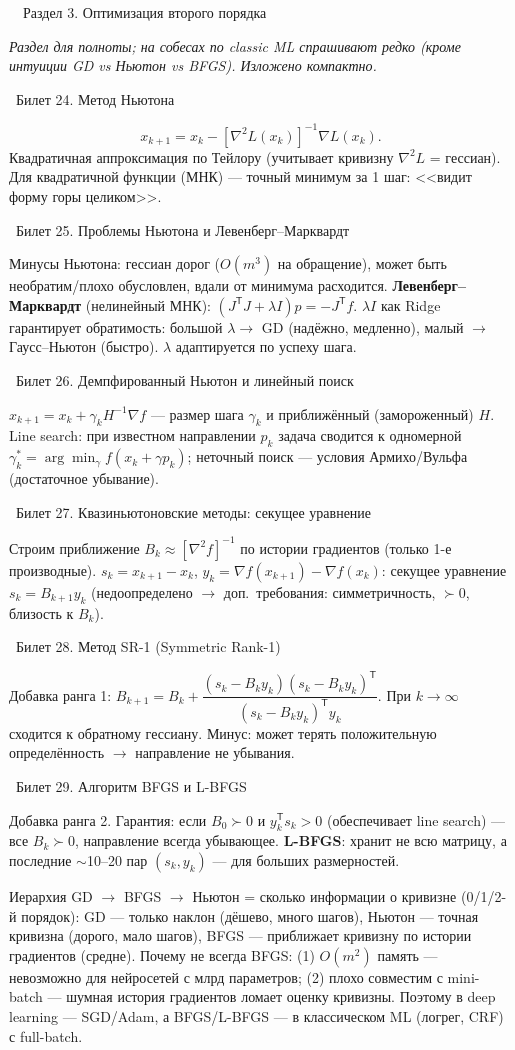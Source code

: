 \documentclass[12pt, a4paper]{article}
\newcommand{\razdel}[2]{%
  \clearpage%
  \noindent\colorbox{razdelcol}{\parbox{\dimexpr\linewidth-2\fboxsep\relax}{%
    \color{white}\LARGE\bfseries\strut\ \ Раздел #1. #2%
  }}%
  \vspace{10pt}%
}
\newcommand{\bilet}[2]{%
  \vspace{10pt}%
  \noindent\colorbox{qcolor}{\parbox{\dimexpr\linewidth-2\fboxsep\relax}{%
    \color{white}\large\bfseries\strut\ Билет #1. #2%
  }}%
  \nopagebreak\vspace{5pt}\par\nopagebreak%
}
\newcommand{\tr}{^{\mathsf{T}}}
\begin{document}
\razdel{3}{Оптимизация второго порядка}

\emph{Раздел для полноты; на собесах по classic ML спрашивают редко (кроме интуиции GD vs Ньютон vs BFGS). Изложено компактно.}

\bilet{24}{Метод Ньютона}
\[
  x_{k+1} = x_k - [\nabla^2 L(x_k)]^{-1}\nabla L(x_k).
\]
Квадратичная аппроксимация по Тейлору (учитывает кривизну $\nabla^2 L$ = гессиан). Для квадратичной функции (МНК) --- точный минимум за 1 шаг: <<видит форму горы целиком>>.

\bilet{25}{Проблемы Ньютона и Левенберг--Марквардт}
Минусы Ньютона: гессиан дорог ($O(m^3)$ на обращение), может быть необратим/плохо обусловлен, вдали от минимума расходится. \textbf{Левенберг--Марквардт} (нелинейный МНК): $(J\tr J + \lambda I)p = -J\tr f$. $\lambda I$ как Ridge гарантирует обратимость: большой $\lambda \to$ GD (надёжно, медленно), малый $\to$ Гаусс--Ньютон (быстро). $\lambda$ адаптируется по успеху шага.

\bilet{26}{Демпфированный Ньютон и линейный поиск}
$x_{k+1} = x_k + \gamma_k H^{-1}\nabla f$ --- размер шага $\gamma_k$ и приближённый (замороженный) $H$. Line search: при известном направлении $p_k$ задача сводится к одномерной $\gamma_k^* = \arg\min_\gamma f(x_k + \gamma p_k)$; неточный поиск --- условия Армихо/Вульфа (достаточное убывание).

\bilet{27}{Квазиньютоновские методы: секущее уравнение}
Строим приближение $B_k \approx [\nabla^2 f]^{-1}$ по истории градиентов (только 1-е производные). $s_k = x_{k+1} - x_k$, $y_k = \nabla f(x_{k+1}) - \nabla f(x_k)$: секущее уравнение $s_k = B_{k+1}y_k$ (недоопределено $\to$ доп.\ требования: симметричность, $\succ 0$, близость к $B_k$).

\bilet{28}{Метод SR-1 (Symmetric Rank-1)}
Добавка ранга 1: $B_{k+1} = B_k + \dfrac{(s_k - B_k y_k)(s_k - B_k y_k)\tr}{(s_k - B_k y_k)\tr y_k}$. При $k \to \infty$ сходится к обратному гессиану. Минус: может терять положительную определённость $\to$ направление не убывания.

\bilet{29}{Алгоритм BFGS и L-BFGS}
Добавка ранга 2. Гарантия: если $B_0 \succ 0$ и $y_k\tr s_k > 0$ (обеспечивает line search) --- все $B_k \succ 0$, направление всегда убывающее. \textbf{L-BFGS}: хранит не всю матрицу, а последние $\sim$10--20 пар $(s_k, y_k)$ --- для больших размерностей.

\begin{fishkabox}
Иерархия GD $\to$ BFGS $\to$ Ньютон = сколько информации о кривизне (0/1/2-й порядок): GD --- только наклон (дёшево, много шагов), Ньютон --- точная кривизна (дорого, мало шагов), BFGS --- приближает кривизну по истории градиентов (средне). Почему не всегда BFGS: (1) $O(m^2)$ память --- невозможно для нейросетей с млрд параметров; (2) плохо совместим с mini-batch --- шумная история градиентов ломает оценку кривизны. Поэтому в deep learning --- SGD/Adam, а BFGS/L-BFGS --- в классическом ML (логрег, CRF) с full-batch.
\end{fishkabox}
\end{document}

